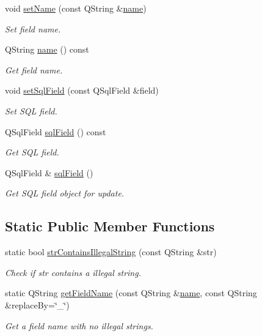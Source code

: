 \begin{DoxyCompactItemize}
void \hyperlink{classmdt_field_map_field_adaf71b43697a9239907d142385125b10}{set\-Name} (const Q\-String \&\hyperlink{classmdt_field_map_field_ab9d17f7703f24baad1e3932978fde338}{name})
\begin{DoxyCompactList}\small\item\em Set field name. \end{DoxyCompactList}\item 
Q\-String \hyperlink{classmdt_field_map_field_ab9d17f7703f24baad1e3932978fde338}{name} () const 
\begin{DoxyCompactList}\small\item\em Get field name. \end{DoxyCompactList}\item 
void \hyperlink{classmdt_field_map_field_a11b5595b1eed08f9136640d9cbe5e978}{set\-Sql\-Field} (const Q\-Sql\-Field \&field)
\begin{DoxyCompactList}\small\item\em Set S\-Q\-L field. \end{DoxyCompactList}\item 
Q\-Sql\-Field \hyperlink{classmdt_field_map_field_a1b168eb4dab3157936d520fb7ad38b76}{sql\-Field} () const 
\begin{DoxyCompactList}\small\item\em Get S\-Q\-L field. \end{DoxyCompactList}\item 
Q\-Sql\-Field \& \hyperlink{classmdt_field_map_field_a955292b902bb21f14f1c0226b084c7cb}{sql\-Field} ()
\begin{DoxyCompactList}\small\item\em Get S\-Q\-L field object for update. \end{DoxyCompactList}\end{DoxyCompactItemize}
\subsection*{Static Public Member Functions}
\begin{DoxyCompactItemize}
\item 
static bool \hyperlink{classmdt_field_map_field_a60ced1a765132203bab6e113cca39081}{str\-Contains\-Illegal\-String} (const Q\-String \&str)
\begin{DoxyCompactList}\small\item\em Check if str contains a illegal string. \end{DoxyCompactList}\item 
static Q\-String \hyperlink{classmdt_field_map_field_acf48382ebd702dae541a9a448c9005a3}{get\-Field\-Name} (const Q\-String \&\hyperlink{classmdt_field_map_field_ab9d17f7703f24baad1e3932978fde338}{name}, const Q\-String \&replace\-By=\char`\"{}\-\_\-\char`\"{})
\begin{DoxyCompactList}\small\item\em Get a field name with no illegal strings. \end{DoxyCompactList}\end{DoxyCompactItemize}


